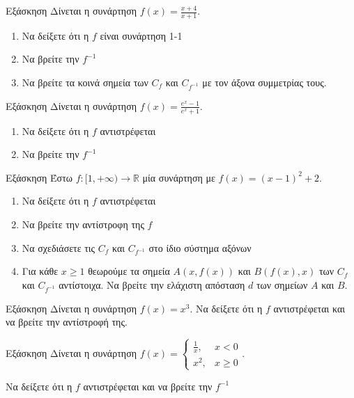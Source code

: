 \documentclass[greek]{beamer}
\begin{document}
\begin{frame}{Εξάσκηση}
  Δίνεται η συνάρτηση $f(x)=\frac{x+4}{x+1}$.
  \begin{enumerate}
    \item Να δείξετε ότι η $f$ είναι συνάρτηση 1-1 \pause
    \item Να βρείτε την $f^{-1}$
    \item Να βρείτε τα κοινά σημεία των $C_f$ και $C_{f^{-1}}$ με τον άξονα συμμετρίας τους.
  \end{enumerate}
\end{frame}

\begin{frame}{Εξάσκηση}
  Δίνεται η συνάρτηση $f(x)=\frac{e^x-1}{e^x+1}$.
  \begin{enumerate}
    \item Να δείξετε ότι η $f$ αντιστρέφεται\pause
    \item Να βρείτε την $f^{-1}$
  \end{enumerate}
\end{frame}

\begin{frame}{Εξάσκηση}
  Έστω $f:[1,+\infty)\to \mathbb{R}$ μία συνάρτηση με $f(x)=(x-1)^2+2$.
  \begin{enumerate}
    \item Να δείξετε ότι η $f$ αντιστρέφεται \pause
    \item Να βρείτε την αντίστροφη της $f$ \pause
    \item Να σχεδιάσετε τις $C_f$ και $C_{f^{-1}}$ στο ίδιο σύστημα αξόνων\pause
    \item Για κάθε $x\ge 1$ θεωρούμε τα σημεία $Α(x,f(x))$ και $Β(f(x),x)$ των $C_f$ και $C_{f^{-1}}$ αντίστοιχα. Να βρείτε την ελάχιστη απόσταση $d$ των σημείων $Α$ και $Β$.
  \end{enumerate}
\end{frame}

\begin{frame}{Εξάσκηση}
  Δίνεται η συνάρτηση $f(x)=x^3$. Να δείξετε ότι η $f$ αντιστρέφεται και να βρείτε την αντίστροφή της.
\end{frame}

\begin{frame}{Εξάσκηση}
  Δίνεται η συνάρτηση $f(x)=\begin{cases}
      \frac{1}{x}, & x<0    \\
      x^2,         & x\ge 0
    \end{cases}$.

  Να δείξετε ότι η $f$ αντιστρέφεται και να βρείτε την $f^{-1}$
\end{frame}
\end{document}
